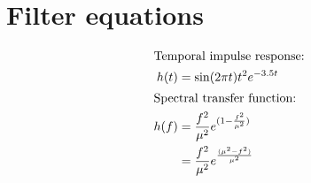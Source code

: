 \documentclass{article} %
\begin{document}
\raggedbottom
\section{Filter equations}


\begin{align*}
\shortintertext{Temporal impulse response:}
h(t) &= \sin(2 \pi t) t^{2} e^{-3.5 t}\\
\shortintertext{Spectral transfer function:}
h(f) &= \frac{f^2} {\mu^2} e^{(1 - \frac{f^2}{\mu^2}) }\\
&= \frac{f^2} {\mu^2} e^{\frac{(\mu^2 - f^2)} {\mu^2} }
\end{align*} 
\end{document}
